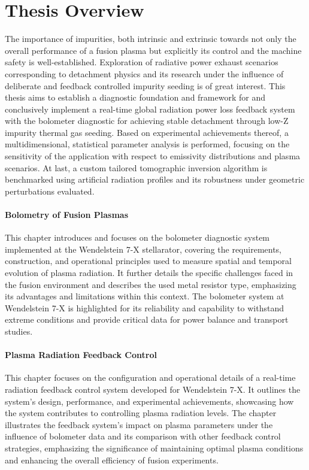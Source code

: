 %
\checkoddpage\ifoddpage\clearpage\else\cleardoublepage\fi%
%
\section*{Thesis Overview}%
%
    The importance of impurities, both intrinsic and extrinsic towards not only the overall performance of a fusion plasma but explicitly its control and the machine safety is well-established. Exploration of radiative power exhaust scenarios corresponding to detachment physics and its research under the influence of deliberate and feedback controlled impurity seeding is of great interest. This thesis aims to establish a diagnostic foundation and framework for and conclusively implement a real-time global radiation power loss feedback system with the bolometer diagnostic for achieving stable detachment through low-Z impurity thermal gas seeding. Based on experimental achievements thereof, a multidimensional, statistical parameter analysis is performed, focusing on the sensitivity of the application with respect to emissivity distributions and plasma scenarios. At last, a custom tailored tomographic inversion algorithm is benchmarked using artificial radiation profiles and its robustness under geometric perturbations evaluated.%
%
    \paragraph*{Bolometry of Fusion Plasmas}%
%
       This chapter introduces and focuses on the bolometer diagnostic system implemented at the Wendelstein 7-X stellarator, covering the requirements, construction, and operational principles used to measure spatial and temporal evolution of plasma radiation. It further details the specific challenges faced in the fusion environment and describes the used metal resistor type, emphasizing its advantages and limitations within this context. The bolometer system at Wendelstein 7-X is highlighted for its reliability and capability to withstand extreme conditions and provide critical data for power balance and transport studies.%
%
    \paragraph*{Plasma Radiation Feedback Control}%
%
        This chapter focuses on the configuration and operational details of a real-time radiation feedback control system developed for Wendelstein 7-X. It outlines the system's design, performance, and experimental achievements, showcasing how the system contributes to controlling plasma radiation levels. The chapter illustrates the feedback system's impact on plasma parameters under the influence of bolometer data and its comparison with other feedback control strategies, emphasizing the significance of maintaining optimal plasma conditions and enhancing the overall efficiency of fusion experiments.%
%
